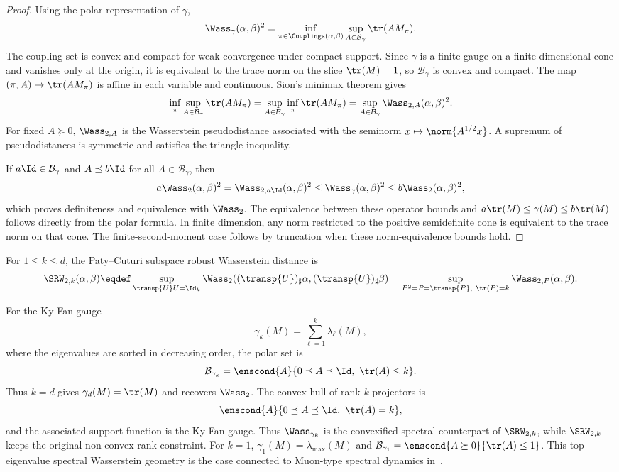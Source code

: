 \begin{proof}
	Using the polar representation of $\gamma$,
	\[
		\Wass_\gamma(\alpha,\beta)^2
		=
		\inf_{\pi\in\Couplings(\alpha,\beta)}
		\sup_{A\in\mathcal B_\gamma}\tr(AM_\pi).
	\]
	The coupling set is convex and compact for weak convergence under compact support. Since $\gamma$ is a finite gauge on a finite-dimensional cone and vanishes only at the origin, it is equivalent to the trace norm on the slice $\tr(M)=1$, so $\mathcal B_\gamma$ is convex and compact. The map $(\pi,A)\mapsto\tr(AM_\pi)$ is affine in each variable and continuous. Sion's minimax theorem gives
	\[
		\inf_\pi\sup_{A\in\mathcal B_\gamma}\tr(AM_\pi)
		=
		\sup_{A\in\mathcal B_\gamma}\inf_\pi\tr(AM_\pi)
		=
		\sup_{A\in\mathcal B_\gamma}\Wass_{2,A}(\alpha,\beta)^2.
	\]
	For fixed $A\succeq0$, $\Wass_{2,A}$ is the Wasserstein pseudodistance associated with the seminorm $x\mapsto\norm{A^{1/2}x}$. A supremum of pseudodistances is symmetric and satisfies the triangle inequality.

	If $a\Id\in\mathcal B_\gamma$ and $A\preceq b\Id$ for all $A\in\mathcal B_\gamma$, then
	\[
		a\Wass_2(\alpha,\beta)^2
		=
		\Wass_{2,a\Id}(\alpha,\beta)^2
		\leq
		\Wass_\gamma(\alpha,\beta)^2
		\leq
		b\Wass_2(\alpha,\beta)^2,
	\]
	which proves definiteness and equivalence with $\Wass_2$. The equivalence between these operator bounds and $a\tr(M)\leq\gamma(M)\leq b\tr(M)$ follows directly from the polar formula. In finite dimension, any norm restricted to the positive semidefinite cone is equivalent to the trace norm on that cone. The finite-second-moment case follows by truncation when these norm-equivalence bounds hold.
\end{proof}

\begin{defn}\label{def-subspace-robust-wasserstein}
	For $1\leq k\leq d$, the Paty--Cuturi subspace robust Wasserstein distance is
	\[
		\SRW_{2,k}(\alpha,\beta)
		\eqdef
		\sup_{\transp{U}U=\Id_k}
		\Wass_2((\transp{U})_\sharp\alpha,(\transp{U})_\sharp\beta)
		=
		\sup_{P^2=P=\transp{P},\ \tr(P)=k}\Wass_{2,P}(\alpha,\beta).
	\]
\end{defn}

For the Ky Fan gauge
\[
	\gamma_k(M)=\sum_{\ell=1}^k\lambda_\ell(M),
\]
where the eigenvalues are sorted in decreasing order, the polar set is
\[
	\mathcal B_{\gamma_k}=\enscond{A}{0\preceq A\preceq\Id,\ \tr(A)\leq k}.
\]
Thus $k=d$ gives $\gamma_d(M)=\tr(M)$ and recovers $\Wass_2$. The convex hull of rank-$k$ projectors is
\[
	\enscond{A}{0\preceq A\preceq\Id,\ \tr(A)=k},
\]
and the associated support function is the Ky Fan gauge. Thus $\Wass_{\gamma_k}$ is the convexified spectral counterpart of $\SRW_{2,k}$, while $\SRW_{2,k}$ keeps the original non-convex rank constraint. For $k=1$, $\gamma_1(M)=\lambda_{\max}(M)$ and $\mathcal B_{\gamma_1}=\enscond{A\succeq0}{\tr(A)\leq1}$.
This top-eigenvalue spectral Wasserstein geometry is the case connected to Muon-type spectral dynamics in~\cite{peyre2026muon}.

